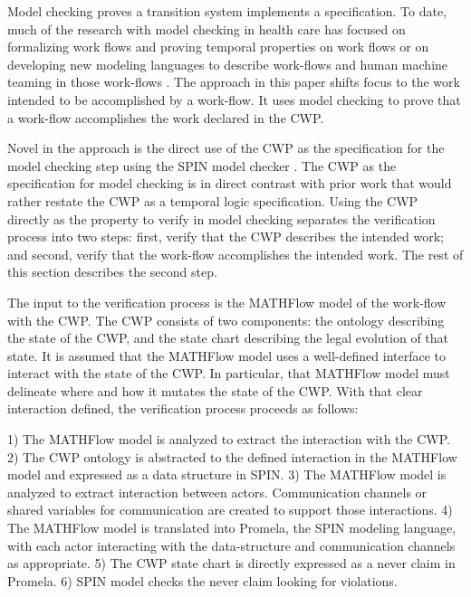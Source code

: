 Model checking proves a transition system implements a
specification. To date, much of the research with model checking in
health care has focused on formalizing work flows and proving temporal
properties on work flows \cite{avrunin, clark, baski} or on developing new modeling
languages to describe work-flows and human machine teaming in those
work-flows \cite{mathflow, boulton}. The approach in this paper shifts
focus to the work intended to be accomplished by a work-flow. It uses
model checking to prove that a work-flow accomplishes the work
declared in the CWP.

Novel in the approach is the direct use of the CWP as the
specification for the model checking step using the SPIN model checker
\cite{spin}. The CWP as the specification for model checking is in
direct contrast with prior work that would rather restate the CWP as a
temporal logic specification. Using the CWP directly as the property
to verify in model checking separates the verification process into
two steps: first, verify that the CWP describes the intended
work; and second, verify that the work-flow accomplishes the
intended work. The rest of this section describes the second step.

The input to the verification process is the MATHFlow model of the
work-flow with the CWP. The CWP consists of two components: the
ontology describing the state of the CWP, and the state chart
describing the legal evolution of that state. It is assumed that the
MATHFlow model uses a well-defined interface to interact with the
state of the CWP. In particular, that MATHFlow model must delineate
where and how it mutates the state of the CWP. With that clear
interaction defined, the verification process proceeds as follows:

1) The MATHFlow model is analyzed to extract the interaction with the CWP.
2) The CWP ontology is abstracted to the defined interaction in the
   MATHFlow model and expressed as a data structure in SPIN.
3) The MATHFlow model is analyzed to extract interaction between
   actors. Communication channels or shared variables for communication
   are created to support those interactions.
4) The MATHFlow model is translated into Promela, the SPIN modeling
   language, with each actor interacting with the data-structure and communication
   channels as appropriate.
5) The CWP state chart is directly expressed as a never claim in Promela.
6) SPIN model checks the never claim looking for violations.

